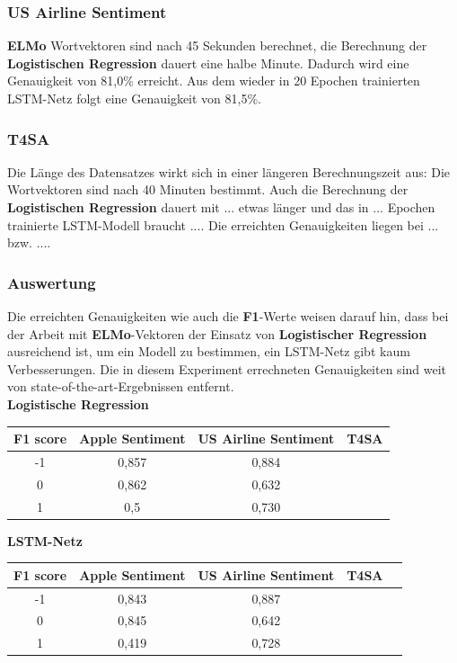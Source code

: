 \subsubsection*{US Airline Sentiment}
\textbf{ELMo} Wortvektoren sind nach 45 Sekunden berechnet, die Berechnung der \textbf{Logistischen Regression} dauert eine halbe Minute. Dadurch wird eine Genauigkeit von 81,0\% erreicht.  Aus dem wieder in 20 Epochen trainierten LSTM-Netz folgt eine Genauigkeit von 81,5\%.

\subsubsection*{T4SA}
Die L\"ange des Datensatzes wirkt sich in einer l\"angeren Berechnungszeit aus: Die Wortvektoren sind nach 40 Minuten bestimmt. Auch die Berechnung der \textbf{Logistischen Regression} dauert mit ... etwas l\"anger und das in ... Epochen trainierte LSTM-Modell braucht .... Die erreichten Genauigkeiten liegen bei ... bzw. .... %

\subsubsection*{Auswertung}
Die erreichten Genauigkeiten wie auch die \textbf{F1}-Werte weisen darauf hin, dass bei der Arbeit mit \textbf{ELMo}-Vektoren der Einsatz von \textbf{Logistischer Regression} ausreichend ist, um ein Modell zu bestimmen, ein LSTM-Netz gibt kaum Verbesserungen. Die in diesem Experiment errechneten Genauigkeiten sind weit von state-of-the-art-Ergebnissen entfernt.\\
\textbf{Logistische Regression}
\begin{center}
\begin{tabular}{|c||c|c|c|}
\hline
F1 score & Apple Sentiment & US Airline Sentiment & T4SA\\ 
\hline\hline
-1 & 0,857 & 0,884 & \\
\hline
0 & 0,862 & 0,632 & \\ 
\hline
1 & 0,5 & 0,730 & \\
\hline    
\end{tabular}
\end{center}

\textbf{LSTM-Netz}
\begin{center}
\begin{tabular}{|c||c|c|c|c|}
\hline
F1 score & Apple Sentiment & US Airline Sentiment & T4SA\\ 
\hline\hline
-1 & 0,843 & 0,887 & \\
\hline
0 & 0,845 & 0,642 & \\ 
\hline
1 & 0,419 & 0,728 & \\
\hline    
\end{tabular}
\end{center}

